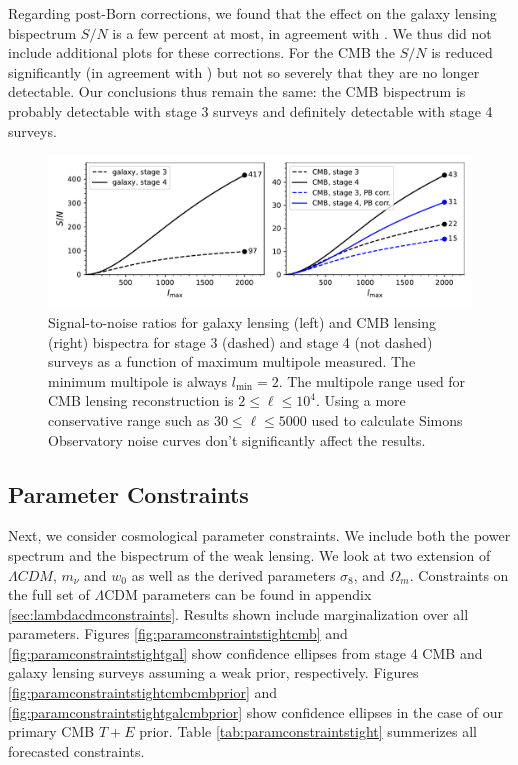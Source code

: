 \documentclass[11pt]{article} %
\begin{document}
Regarding post-Born corrections, we found that the effect on the galaxy lensing bispectrum $S/N$ is a few percent at most, in agreement with \cite{galpostbornlbscorr}. We thus did not include additional plots for these corrections. For the CMB the $S/N$ is reduced significantly (in agreement with \cite{postborn_pratten_lewis}) but not so severely that they are no longer detectable. Our conclusions thus remain the same: the CMB bispectrum is probably detectable with stage 3 surveys and definitely detectable with stage 4 surveys.

\begin{figure}[h!]
    \includegraphics[width=\textwidth]{figures/snrplots.pdf}
    \caption{Signal-to-noise ratios for galaxy lensing (left) and CMB lensing (right) bispectra for stage 3 (dashed) and stage 4 (not dashed) surveys as a function of maximum multipole measured. The minimum multipole is always $l_{\text{min}}=2$. The multipole range used for CMB lensing reconstruction is $2\leq \ell \leq 10^4$. Using a more conservative range such as $30\leq \ell \leq 5000$ used to calculate Simons Observatory noise curves don't significantly affect the results.}
    \label{fig:snrplots}
\end{figure}

\subsection{Parameter Constraints}
Next, we consider cosmological parameter constraints. We include both the power spectrum and the bispectrum of the weak lensing. We look at two extension of $\Lambda CDM$, $m_\nu$ and $w_0$ as well as the derived parameters $\sigma_8$, and $\Omega_m$. Constraints on the full set of $\Lambda$CDM parameters can be found in appendix \ref{sec:lambdacdmconstraints}. Results shown include marginalization over all parameters. Figures \ref{fig:paramconstraintstightcmb} and \ref{fig:paramconstraintstightgal} show confidence ellipses from stage 4 CMB and galaxy lensing surveys assuming a weak prior, respectively. Figures \ref{fig:paramconstraintstightcmbcmbprior} and \ref{fig:paramconstraintstightgalcmbprior} show confidence ellipses in the case of our primary CMB $T+E$ prior. Table \ref{tab:paramconstraintstight} summerizes all forecasted constraints. 
\end{document}
